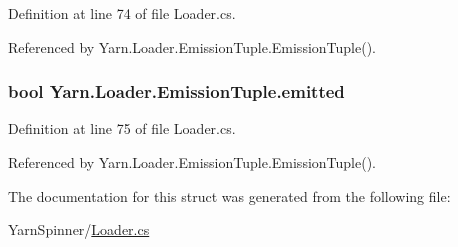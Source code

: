 Definition at line 74 of file Loader.\-cs.



Referenced by Yarn.\-Loader.\-Emission\-Tuple.\-Emission\-Tuple().

\hypertarget{a00095_a5916dbbd4d2e24ddfd02b0afdea290bf}{
\subsubsection[{emitted}]{\setlength{\rightskip}{0pt plus 5cm}bool Yarn.\-Loader.\-Emission\-Tuple.\-emitted}}\label{a00095_a5916dbbd4d2e24ddfd02b0afdea290bf}


Definition at line 75 of file Loader.\-cs.



Referenced by Yarn.\-Loader.\-Emission\-Tuple.\-Emission\-Tuple().



The documentation for this struct was generated from the following file\-:\begin{DoxyCompactItemize}
\item 
Yarn\-Spinner/\hyperlink{a00291}{Loader.\-cs}\end{DoxyCompactItemize}
